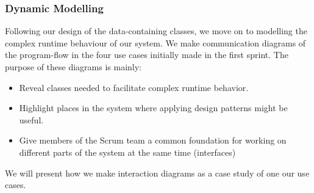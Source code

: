 \subsubsection{Dynamic Modelling}
Following our design of the data-containing classes, we move on to modelling the complex runtime behaviour of our system. We make communication diagrams of the program-flow in the four use cases initially made in the first sprint. The purpose of these diagrams is mainly:
\begin{itemize}
\item Reveal classes needed to facilitate complex runtime behavior. 
\item Highlight places in the system where applying design patterns might be useful.
\item Give members of the Scrum team a common foundation for working on different parts of the system at the same time (interfaces)
\end{itemize}
We will present how we make interaction diagrams as a case study of one our use cases.
